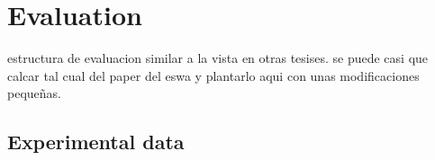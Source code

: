 


\section{Evaluation}\label{sec:spacerl-evaluation}
estructura de evaluacion similar a la vista en otras tesises.
se puede casi que calcar tal cual del paper del eswa y plantarlo aqui con unas modificaciones pequeñas.

\subsection{Experimental data}

